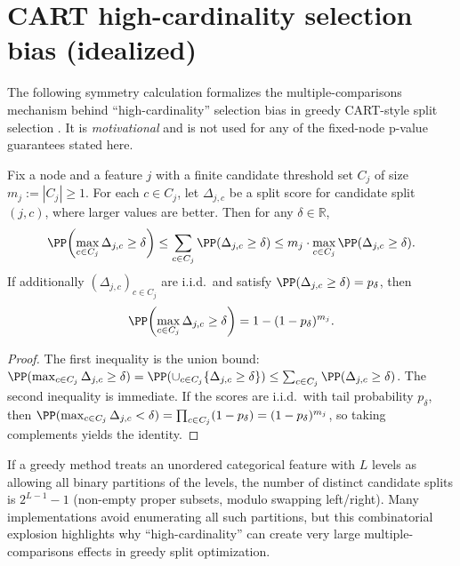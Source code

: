 \section{CART high-cardinality selection bias (idealized)}
\label{app:cart-bias}

The following symmetry calculation formalizes the multiple-comparisons
mechanism behind ``high-cardinality'' selection bias in greedy CART-style
split selection \citep{Breiman1984ClassificationAndRegressionTrees}. It is
\emph{motivational} and is not used for any of the fixed-node p-value
guarantees stated here.

\begin{lemma}
\label{lem:cart-union-bound}
Fix a node and a feature $j$ with a finite candidate threshold set $C_j$ of size
$m_j := |C_j| \ge 1$. For each $c \in C_j$, let $\Delta_{j,c}$ be a split score
for candidate split $(j,c)$, where larger values are better. Then for any
$\delta \in \mathbb{R}$,
%
\begin{equation}
  \PP\!\left(\max_{c \in C_j} \Delta_{j,c} \ge \delta\right)
  \le \sum_{c \in C_j} \PP(\Delta_{j,c} \ge \delta)
  \le m_j \cdot \max_{c \in C_j} \PP(\Delta_{j,c} \ge \delta).
\end{equation}
%
If additionally $(\Delta_{j,c})_{c \in C_j}$ are i.i.d.\ and satisfy
$\PP(\Delta_{j,c} \ge \delta) = p_\delta$, then
%
\begin{equation}
  \PP\!\left(\max_{c \in C_j} \Delta_{j,c} \ge \delta\right) = 1-(1-p_\delta)^{m_j}.
\end{equation}
\end{lemma}

\begin{proof}
The first inequality is the union bound:
$\PP(\max_{c \in C_j}\Delta_{j,c} \ge \delta)
= \PP(\cup_{c \in C_j}\{\Delta_{j,c} \ge \delta\})
\le \sum_{c \in C_j}\PP(\Delta_{j,c} \ge \delta)$.
The second inequality is immediate.
If the scores are i.i.d.\ with tail probability $p_\delta$, then
$\PP(\max_{c \in C_j}\Delta_{j,c} < \delta) = \prod_{c \in C_j} (1-p_\delta)
  = (1-p_\delta)^{m_j}$, so taking complements yields the identity.
\end{proof}

\begin{remark}
If a greedy method treats an unordered categorical feature with $L$ levels as
allowing all binary partitions of the levels, the number of distinct candidate
splits is $2^{L-1}-1$ (non-empty proper subsets, modulo swapping left/right).
Many implementations avoid enumerating all such partitions, but this
combinatorial explosion highlights why ``high-cardinality'' can create very
large multiple-comparisons effects in greedy split optimization.
\end{remark}

